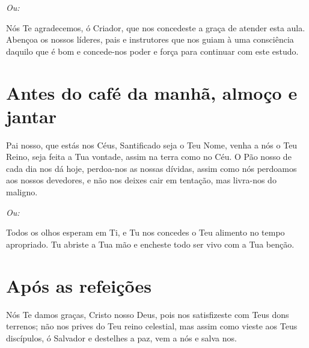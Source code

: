 \documentclass{subfiles}
\begin{document}
\textit{Ou:}

Nós Te agradecemos, ó Criador, que nos concedeste a graça de atender esta aula.
Abençoa os nossos líderes, pais e instrutores que nos guiam à uma consciência
daquilo que é bom e concede-nos poder e força para continuar com este estudo.

\section*{Antes do café da manhã, almoço e jantar}

Pai nosso, que estás nos Céus, Santificado seja o Teu Nome, venha a nós o Teu 
Reino, seja feita a Tua vontade, assim na terra como no Céu. O Pão nosso de 
cada dia nos dá hoje, perdoa-nos as nossas dívidas, assim como nós 
perdoamos aos nossos devedores, e não nos deixes cair em tentação, mas 
livra-nos do maligno. 

\textit{Ou:}

Todos os olhos esperam em Ti, e Tu nos concedes o Teu alimento no tempo 
apropriado. Tu abriste a Tua mão e encheste todo ser vivo com a Tua benção. 

\section*{Após as refeições}

Nós Te damos graças, Cristo nosso Deus, pois nos satisfizeste com Teus dons 
terrenos; não nos prives do Teu reino celestial, mas assim como vieste aos Teus 
discípulos, ó Salvador e destelhes a paz, vem a nós e salva nos.
\end{document}
